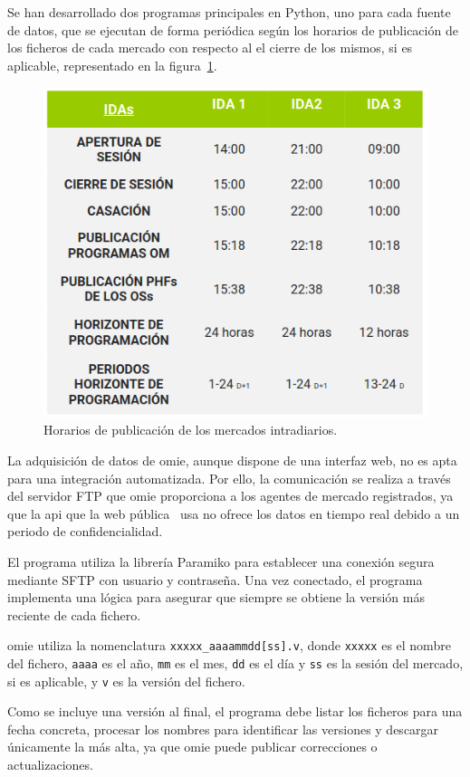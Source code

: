 Se han desarrollado dos programas principales en Python, uno para cada fuente de datos, que se ejecutan de forma periódica según los horarios de publicación de los ficheros de cada mercado con respecto al el cierre de los mismos, si es aplicable, representado en la figura~\ref{fig:horarios-publicacion}.

\begin{figure}
  \centering
  \includegraphics[width=0.5\linewidth]{figures/horarios-publicacion.png}
  \caption[Horarios de publicación de mercados intradiarios.]{Horarios de publicación de los mercados intradiarios.}
  \label{fig:horarios-publicacion}
\end{figure}

La adquisición de datos de \gls{omie}, aunque dispone de una interfaz web, no es apta para una integración automatizada. Por ello, la comunicación se realiza a través del servidor FTP que \gls{omie} proporciona a los agentes de mercado registrados, ya que la \gls{api} que la web pública~\cite{omie2025acceso} usa no ofrece los datos en tiempo real debido a un periodo de confidencialidad.

El programa utiliza la librería Paramiko para establecer una conexión segura mediante SFTP con usuario y contraseña. Una vez conectado, el programa implementa una lógica para asegurar que siempre se obtiene la versión más reciente de cada fichero.

\Gls{omie} utiliza la nomenclatura \texttt{xxxxx\_aaaammdd[ss].v}, donde \texttt{xxxxx} es el nombre del fichero, \texttt{aaaa} es el año, \texttt{mm} es el mes, \texttt{dd} es el día y \texttt{ss} es la sesión del mercado, si es aplicable, y \texttt{v} es la versión del fichero.

Como se incluye una versión al final, el programa debe listar los ficheros para una fecha concreta, procesar los nombres para identificar las versiones y descargar únicamente la más alta, ya que \gls{omie} puede publicar correcciones o actualizaciones.

